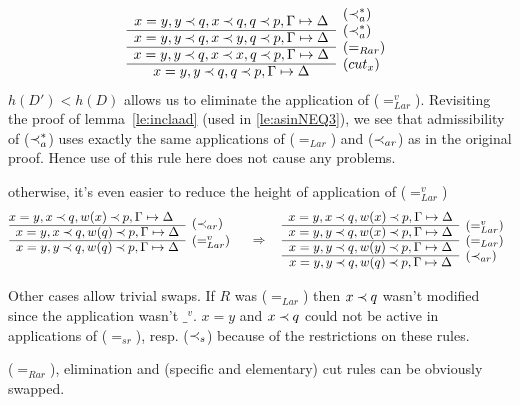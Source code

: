 \begin{PROOF}
\begin{LS}
\begin{LSA}
\begin{LSB}
\[\begin{array}{cl}
x=y, y\Incl q, x\Incl q, q\Incl p, \GSD & \raisebox{1.2ex}[1.5ex][0ex]{($\Incl_a^*$)} \\ \cline{1-1}
x=y, y\Incl q, x\Incl y, q\Incl p, \GSD & \raisebox{1.2ex}[1.5ex][0ex]{($\Incl_a^*$)} \\ \cline{1-1}
x=y, y\Incl q, x\Incl x, q\Incl p, \GSD & \raisebox{1.2ex}[1.5ex][0ex]{($=_{Rar}$)} \\ \cline{1-1}
x=y, y\Incl q, q\Incl p, \GSD & \raisebox{1.2ex}[1.5ex][0ex]{($cut_x$)} 
\end{array}
\]
$h(D')<h(D)$ allows us to eliminate the application of ($=_{Lar}^v$). Revisiting the proof
of lemma~\ref{le:inclaad} (used in \ref{le:asinNEQ3}), we see that admissibility of 
($\mathbin{\prec}_a^*$) uses exactly the same applications of
($=_{Lar}$) and ($\mathbin{\prec}_{ar}$) as in the original proof. Hence use of this rule here does not
cause any problems.
\item otherwise, it's even easier to reduce the height of application of ($=_{Lar}^v$)
\[ \begin{array}{cl} \hspace*{-1em}
x=y, x\Incl q, w(x)\Incl p,\GSD  &\raisebox{-1.2ex}[1.5ex][0ex]{($\Incl_{ar}$)}\\ \cline{1-1}
x=y, x\Incl q, w(q)\Incl p, \GSD &  \\ \cline{1-1}
x=y, y\Incl q, w(q)\Incl p, \GSD & \raisebox{1.2ex}[1.5ex][0ex]{($=_{Lar}^v$)} \\  \ 
\end{array}
\conv
\begin{array}{cl}
x=y, x\Incl q, w(x)\Incl p,\GSD  \\ \cline{1-1}
x=y, y\Incl q, w(x)\Incl p,\GSD  & \raisebox{1.2ex}[1.5ex][0ex]{($=_{Lar}^v$)} \\ \cline{1-1}
x=y, y\Incl q, w(y)\Incl p,\GSD  & \raisebox{1.2ex}[1.5ex][0ex]{($=_{Lar}$)} \\ \cline{1-1}
x=y, y\Incl q, w(q)\Incl p,\GSD  & \raisebox{1.2ex}[1.5ex][0ex]{($\Incl_{ar}$)} 
\end{array}
\]
\end{LSB}
\item\label{caseAB} 
Other cases allow trivial swaps. If $R$ was ($=_{Lar}$) then $x\mathbin{\prec} q$ wasn't modified
since the application wasn't $\_^v$. 
$x=y$ and $x\mathbin{\prec} q$ could not be active in 
applications of ($=_{sr}$), resp. ($\mathbin{\prec}_s$) because of the restrictions on these rules.

($=_{Rar}$), elimination and (specific and elementary) cut rules can be obviously swapped.
\end{LSA}


\end{LS}
\end{PROOF}
